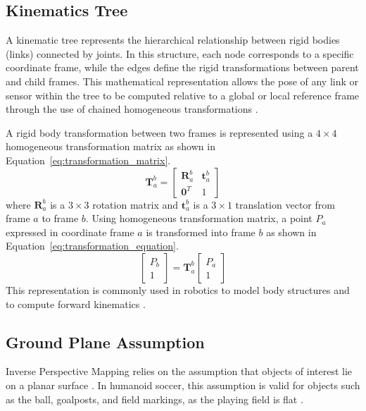 \documentclass[journal]{IAENGtran}
\begin{document}
\subsection{Kinematics Tree}
A kinematic tree represents the hierarchical relationship between rigid
bodies (links) connected by joints. In this structure, each node corresponds
to a specific coordinate frame, while the edges define the rigid transformations
between parent and child frames. This mathematical representation allows the pose
of any link or sensor within the tree to be computed relative to a global or local
reference frame through the use of chained homogeneous transformations \cite{Craig2009,Siciliano2010}.

A rigid body transformation between two frames is represented using
a $4 \times 4$ homogeneous transformation matrix as shown in Equation~\ref{eq:transformation_matrix}.
\begin{equation} \label{eq:transformation_matrix}
\mathbf{T}_{a}^{b} =
\begin{bmatrix}
\mathbf{R}_{a}^{b} & \mathbf{t}_{a}^{b} \\
\mathbf{0}^{T} & 1
\end{bmatrix}
\end{equation}
where $\mathbf{R}_{a}^{b}$ is a $3 \times 3$ rotation matrix and
$\mathbf{t}_{a}^{b}$ is a $3 \times 1$ translation vector from frame
$a$ to frame $b$. Using homogeneous transformation matrix, a point $P_a$ expressed
in coordinate frame $a$ is transformed into frame $b$ as shown in
Equation~\ref{eq:transformation_equation}.
\begin{equation} \label{eq:transformation_equation}
\begin{bmatrix} P_b \\ 1 \end{bmatrix} = \mathbf{T}_{a}^{b} \begin{bmatrix} P_a \\ 1 \end{bmatrix}
\end{equation}
This representation is commonly used in robotics to model body structures and
to compute forward kinematics \cite{Kajita2014}.

\subsection{Ground Plane Assumption}
Inverse Perspective Mapping relies on the assumption that objects of interest lie on a planar surface \cite{Mark2024}.
In humanoid soccer, this assumption is valid for objects such as the ball, goalposts, and field markings,
as the playing field is flat \cite{RoboCupHumanoidLeague2025}.
\end{document}

